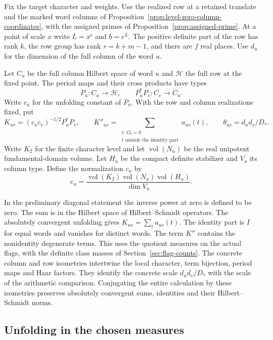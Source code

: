 \begin{paramdefinition}\label{hyp:full-gram-row}
Fix the target character and weights. Use the realized row at a
retained translate and the marked word columns of
Proposition~\ref{prop:level-zero-column-coordinates}, with the
assigned primes of Proposition~\ref{prop:assigned-prime}. At a point of scale \(x\) write \(L=x^\epsilon\) and
\(b=e^L\). The positive definite part of the row has rank \(k\), the
row group has rank \(r=k+m-1\), and there are \(f\) real places.
Use \(d_u\) for the dimension of the full column of the word \(u\).

Let \(C_u\) be the full column Hilbert space of word \(u\) and \(\mathcal H\) the full row at the fixed point. The period maps and their cross products have types 
\[
 P_u:C_u\longrightarrow\mathcal H,\qquad P_u^*P_v:C_v\longrightarrow C_u.
\]
 Write \(c_u\) for the unfolding constant of \(P_u\). With the row and column
realizations fixed, put
\[
 K_{uv}=(c_uc_v)^{-1/2}P_u^*P_v,\qquad
 K''_{uv}=\sum_{\substack{t:\,G_t=0\\ t\text{ outside the identity part}}}
                      a_{uv}(t),\qquad
 \theta_{uv}=d_ud_v/D_* .
\]
Write \(K_2\) for the finite character level and let
\(\operatorname{vol}(N_u)\) be the real unipotent
fundamental-domain volume. Let \(H_u\) be the compact definite
stabilizer and \(V_u\) its column type. Define the normalization
\(c_u\) by
\[
  c_u=\frac{\operatorname{vol}(K_2)
              \operatorname{vol}(N_u)
              \operatorname{vol}(H_u)}{\dim V_u}.
\]
\end{paramdefinition}
In the preliminary diagonal statement the inverse power at zero is defined to be zero.
The sum is in the Hilbert space of Hilbert--Schmidt operators.
The absolutely convergent unfolding gives \(K_{uv}=\sum_t a_{uv}(t)\).
The identity part is \(I\) for equal words and vanishes for distinct
words. The term \(K''\) contains the nonidentity degenerate terms.
This uses the quotient measures on the actual flags, with the
definite class masses of Section~\ref{sec:flag-counts}. The concrete
column and row isometries intertwine the local character,
term bijection, period maps and Haar factors. They identify the
concrete scale \(d_ud_v/D_*\) with the scale of the arithmetic
comparison. Conjugating the entire calculation by these isometries
preserves absolutely convergent sums, identities and their
Hilbert--Schmidt norms. \label{cor:selected-row-gram-1}

\subsection{Unfolding in the chosen measures}

